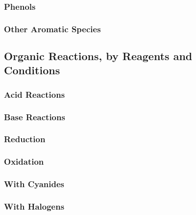\documentclass[../main]{subfiles}
\begin{document}
		\subsubsection{Phenols}
		\subsubsection{Other Aromatic Species}

	\subsection{Organic Reactions, by Reagents and Conditions}

		\subsubsection{Acid Reactions}
		\subsubsection{Base Reactions}

		\subsubsection{Reduction}
		\subsubsection{Oxidation}

		\subsubsection{With Cyanides}
		\subsubsection{With Halogens}
	
\end{document}
